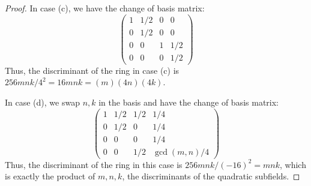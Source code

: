 \begin{proof}
    In case (c), we have the change of basis matrix:
    \[ \left(\begin{array}{cccc} 1 & 1/2 & 0 & 0 \\ 0 & 1/2 & 0 & 0 \\ 0 & 0 & 1 & 1/2 \\ 0 & 0 & 0 & 1/2 \end{array}\right) \]
    Thus, the discriminant of the ring in case (c) is $256mnk/4^2 = 16mnk = (m)(4n)(4k)$.

    In case (d), we swap $n,k$ in the basis and have the change of basis matrix:
    \[ \left(\begin{array}{cccc} 1 & 1/2 & 1/2 & 1/4 \\ 0 & 1/2 & 0 & 1/4 \\ 0 & 0 & 0 & 1/4 \\ 0 & 0 & 1/2 & \gcd(m,n)/4 \end{array}\right) \]
    Thus, the discriminant of the ring in this case is $256mnk/(-16)^2 = mnk$, which is exactly the product of $m,n,k$, the discriminants of the quadratic subfields.
\end{proof}
